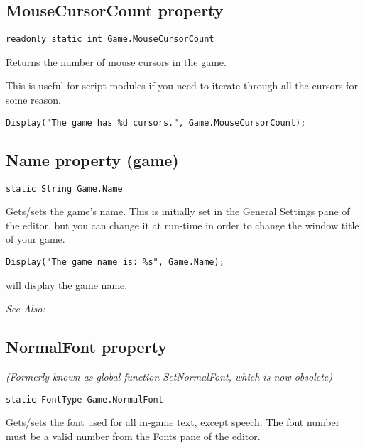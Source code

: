\subsection{MouseCursorCount property}\label{Game.MouseCursorCount}%

\begin{verbatim}
readonly static int Game.MouseCursorCount
\end{verbatim}
Returns the number of mouse cursors in the game.

This is useful for script modules if you need to iterate through all the cursors for some reason.

\begin{verbatim}
Display("The game has %d cursors.", Game.MouseCursorCount);
\end{verbatim}


\subsection{Name property (game)}\label{Game.Name}%

\begin{verbatim}
static String Game.Name
\end{verbatim}
Gets/sets the game's name. This is initially set in the General Settings pane of the editor,
but you can change it at run-time in order to change the window title of your game.

\begin{verbatim}
Display("The game name is: %s", Game.Name);
\end{verbatim}
will display the game name.

\it{See Also:} 


\subsection{NormalFont property}\label{Game.NormalFont}%

\it{(Formerly known as global function SetNormalFont, which is now obsolete)}

\begin{verbatim}
static FontType Game.NormalFont
\end{verbatim}
Gets/sets the font used for all in-game text, except speech.
The font number must be a valid number from the Fonts pane of the editor.

